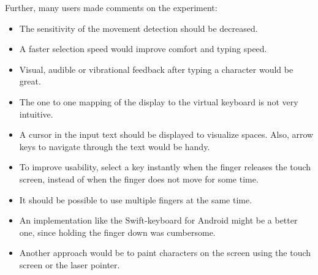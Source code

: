 Further, many users made comments on the experiment:
\begin{itemize}
	\item The sensitivity of the movement detection should be decreased.
	\item A faster selection speed would improve comfort and typing speed.
	\item Visual, audible or vibrational feedback after typing a character would be great.
	\item The one to one mapping of the display to the virtual keyboard is not very intuitive.
	\item A cursor in the input text should be displayed to visualize spaces. Also, arrow keys to navigate through the text would be handy.
	\item To improve usability, select a key instantly when the finger releases the touch screen, instead of when the finger does not move for some time.
	\item It should be possible to use multiple fingers at the same time.
	\item An implementation like the Swift-keyboard for Android might be a better one, since holding the finger down was cumbersome.
	\item Another approach would be to paint characters on the screen using the touch screen or the laser pointer.
\end{itemize}
